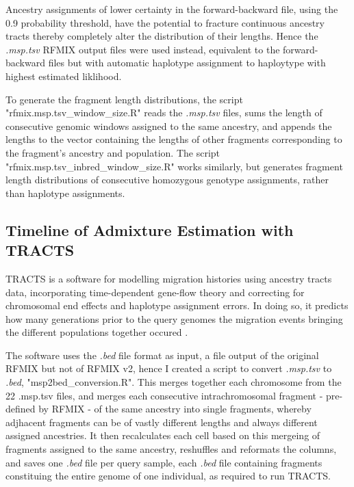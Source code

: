 \documentclass[11pt]{article}
\begin{document}
Ancestry assignments of lower certainty in the forward-backward file, using the 0.9 probability threshold, have the potential to fracture continuous ancestry tracts thereby completely alter the distribution of their lengths. Hence the \textit{.msp.tsv} RFMIX output files were used instead, equivalent to the forward-backward files but with automatic haplotype assignment to haploytype with highest estimated liklihood.

To generate the fragment length distributions, the script "rfmix.msp.tsv\_window\_size.R" reads the \textit{.msp.tsv} files, sums the length of consecutive genomic windows assigned to the same ancestry, and appends the lengths to the vector containing the lengths of other fragments corresponding to the fragment's ancestry and population. The script "rfmix.msp.tsv\_inbred\_window\_size.R" works similarly, but generates fragment length distributions of consecutive homozygous genotype assignments, rather than haplotype assignments. 





\subsection{Timeline of Admixture Estimation with TRACTS}

TRACTS is a software for modelling migration histories using ancestry tracts data, incorporating time-dependent gene-flow theory and correcting for chromosomal end effects and haplotype assignment errors. In doing so, it predicts how many generations prior to the query genomes the migration events bringing the different populations together occured \parencite{Gravel2012}.

The software uses the \textit{.bed} file format as input, a file output of the original RFMIX but not of RFMIX v2, hence I created a script to convert \textit{.msp.tsv} to \textit{.bed}, "msp2bed\_conversion.R". This merges together each chromosome from the 22 .msp.tsv files, and merges each consecutive intrachromosomal fragment - pre-defined by RFMIX - of the same ancestry into single fragments, whereby adjhacent fragments can be of vastly different lengths and always different assigned ancestries. It then recalculates each cell based on this mergeing of fragments assigned to the same ancestry, reshuffles and reformats the columns, and saves one \textit{.bed} file per query sample, each \textit{.bed} file containing fragments constituing the entire genome of one individual, as required to run TRACTS.
\end{document}
